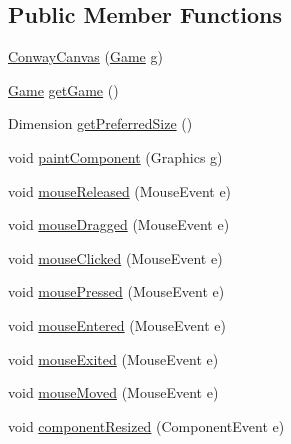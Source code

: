 \subsection*{Public Member Functions}
\begin{DoxyCompactItemize}
\item 
\hyperlink{classio_1_1github_1_1chrishengler_1_1conway_1_1_conway_canvas_a05e3fb830cb3bc30f6915dbdcf413e33}{Conway\+Canvas} (\hyperlink{classio_1_1github_1_1chrishengler_1_1conway_1_1_game}{Game} g)
\item 
\hyperlink{classio_1_1github_1_1chrishengler_1_1conway_1_1_game}{Game} \hyperlink{classio_1_1github_1_1chrishengler_1_1conway_1_1_conway_canvas_a8d0713b9676e81693a4f205359cbdd2c}{get\+Game} ()
\item 
Dimension \hyperlink{classio_1_1github_1_1chrishengler_1_1conway_1_1_conway_canvas_a372d17eeea7391a3db4194cafa321ed5}{get\+Preferred\+Size} ()
\item 
void \hyperlink{classio_1_1github_1_1chrishengler_1_1conway_1_1_conway_canvas_a4741c2dfc2913ba79e8e4218401a6c71}{paint\+Component} (Graphics g)
\item 
void \hyperlink{classio_1_1github_1_1chrishengler_1_1conway_1_1_conway_canvas_af573b11d5c693a94c605f0b6de1eea00}{mouse\+Released} (Mouse\+Event e)
\item 
void \hyperlink{classio_1_1github_1_1chrishengler_1_1conway_1_1_conway_canvas_a5e892360ad85e63435b65f55c6d67566}{mouse\+Dragged} (Mouse\+Event e)
\item 
void \hyperlink{classio_1_1github_1_1chrishengler_1_1conway_1_1_conway_canvas_a5b9c577520a81a80599ac9c591f678f6}{mouse\+Clicked} (Mouse\+Event e)
\item 
void \hyperlink{classio_1_1github_1_1chrishengler_1_1conway_1_1_conway_canvas_a9d2b3c6f5be5f2ab11c90b2658d3ab1d}{mouse\+Pressed} (Mouse\+Event e)
\item 
void \hyperlink{classio_1_1github_1_1chrishengler_1_1conway_1_1_conway_canvas_aab7389a32ac1f365ab26e6d68687fdcf}{mouse\+Entered} (Mouse\+Event e)
\item 
void \hyperlink{classio_1_1github_1_1chrishengler_1_1conway_1_1_conway_canvas_ad04a3ee8212500ccd023cc7ce20e9835}{mouse\+Exited} (Mouse\+Event e)
\item 
void \hyperlink{classio_1_1github_1_1chrishengler_1_1conway_1_1_conway_canvas_a82fe5a7bc1e656b73d22e8206310e97d}{mouse\+Moved} (Mouse\+Event e)
\item 
void \hyperlink{classio_1_1github_1_1chrishengler_1_1conway_1_1_conway_canvas_a7899d6724284cd68df5d4ea7b3c65c8b}{component\+Resized} (Component\+Event e)

\end{DoxyCompactItemize}
